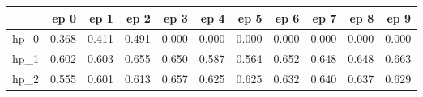 \begin{tabular}{lrrrrrrrrrr}
\toprule
{} &   ep 0 &   ep 1 &   ep 2 &   ep 3 &   ep 4 &   ep 5 &   ep 6 &   ep 7 &   ep 8 &   ep 9 \\
\midrule
hp\_0 &  0.368 &  0.411 &  0.491 &  0.000 &  0.000 &  0.000 &  0.000 &  0.000 &  0.000 &  0.000 \\
hp\_1 &  0.602 &  0.603 &  0.655 &  0.650 &  0.587 &  0.564 &  0.652 &  0.648 &  0.648 &  0.663 \\
hp\_2 &  0.555 &  0.601 &  0.613 &  0.657 &  0.625 &  0.625 &  0.632 &  0.640 &  0.637 &  0.629 \\
\bottomrule
\end{tabular}
